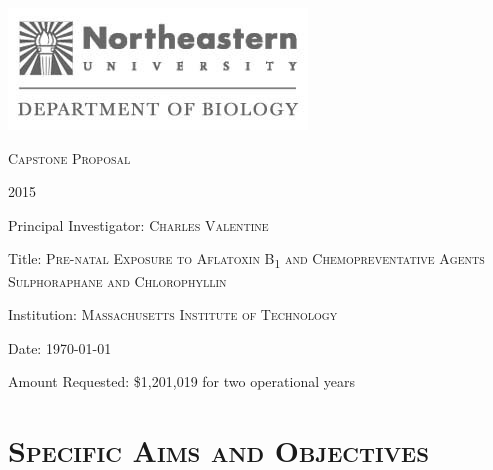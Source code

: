 \documentclass[12pt]{article}
\begin{document}

\begin{titlepage}

\begin{center}
\includegraphics[scale=0.6]{northeastern_logo.jpg}

\noindent
\textsc{Capstone Proposal}

\textsc{2015}
\end{center}

\vspace{2cm}

\noindent
Principal Investigator: \textsc{Charles Valentine}

\vspace{1cm}

\noindent
Title:
\textsc{Pre-natal Exposure to Aflatoxin B\textsubscript{1} and Chemopreventative Agents Sulphoraphane and Chlorophyllin}

\vfill

\noindent
Institution: \textsc{Massachusetts Institute of Technology}

\vspace{1cm}

\noindent
Date: \today

\vspace{1cm}

\noindent
Amount Requested: \$1,201,019 for two operational years

\vspace{5cm}

\end{titlepage}



\newpage

\section*{\upshape\textsc{Specific Aims and Objectives}}
\end{document}
